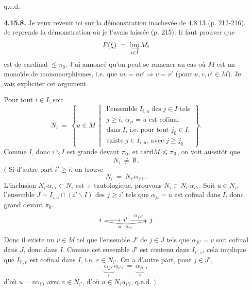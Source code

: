 \hfill q.e.d.


\textbf{4.15.8.} Je veux revenir ici sur la démonstration inachevée de 4.8.13 (p. 212-216). Je reprends la démonstration où je l'avais laissée (p. 215). Il faut prouver que
\[
F(\xi) \ = \ \varinjlim_{i\in I} M_i
\]
est de cardinal $\leqslant \pi_0$. J'ai annoncé qu'on peut se ramener au cas où $M$ est un monoïde de monomorphismes, i.e. que $uv = uv' \Longrightarrow v = v'$ (pour $u,v,v' \in M$). Je vais expliciter cet argument.

Pour tout $i\in I$, soit
\[
N_i \ = \ \left\{ u \in M \ \middle| \ \begin{array}{l}
\text{l'ensemble } I_{i,u} \text{ des } j\in I \text{ tels}\\
j \geqslant i,\ \alpha_{ji} = u \text{ est cofinal}\\
\text{dans } I\text{, i.e. pour tout } j_0\in I,\\
\text{existe } j \in I_{i,u}\text{, avec } j \geqslant j_0
\end{array} \right\} .
\tag*{(4.15.8.1)}
\]
Comme $I$, donc $i\backslash I$ est grande devant $\pi_0$, et $\mathrm{card} M \leqslant \pi_0$, on voit aussitôt que
\[
N_i \ \neq \ \emptyset \ .
\tag*{(4.15.8.2)}
\]
$\Big($ Si d'autre part $i' \geqslant i$, on trouve
\[
N_i \ = \ N_{i'}\alpha_{i'i} \ .
\tag*{(4.15.8.3)}
\]
L'inclusion $N_{i'}\alpha_{i'i} \subset N_i$ est $\pm$ tautologique, prouvons $N_i \subset N_{i'}\alpha_{i'i}$. Soit $u \in N_i$, l'ensemble $J = I_{i,u} \cap (i'\backslash I)$ des $j \geqslant i'$ tels que $\alpha_{ji} = u$ est cofinal dans $I$, donc grand devant $\pi_0$.
\[
\begin{tikzcd}
i \arrow[r] \arrow[rr, bend right=12, "u = \alpha_{ji}"'] & i' \arrow[r, "\alpha_{ji'}"] & j
\end{tikzcd}
\]
Donc il existe un $v \in M$ tel que l'ensemble $J'$ de $j\in J$ tels que $\alpha_{ji'} = v$
soit cofinal dans $J$, donc dans $I$. Comme cet ensemble $J'$ est contenu dans $I_{i',v}$, cela implique que $I_{i',v}$ est cofinal dans $I$, i.e. $v \in N_{i'}$. On a d'autre part, pour $j \in J'$,
\[
\underbrace{\alpha_{ji'}}_{v}\alpha_{i'i} \ = \ \underbrace{\alpha_{ji}}_{u} \ ,
\]
d'où $u = v\alpha_{i'i}$ avec $v\in N_{i'}$, d'où $u \in N_i\alpha_{i'i}$, q.e.d. $\Big)$ %

